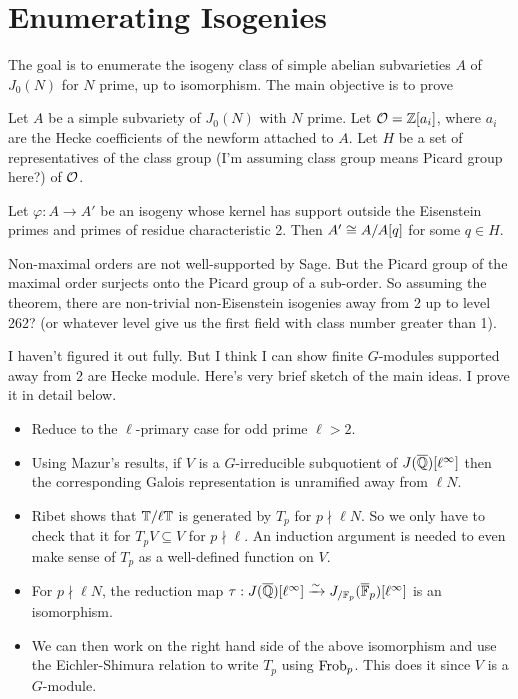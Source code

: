 \documentclass{article}
\begin{document}
\section{Enumerating Isogenies}

The goal is to enumerate the isogeny class of simple abelian subvarieties $A$
of $J_0(N)$ for $N$ prime, up to isomorphism. The main objective is to prove

\begin{theorem}\label{theorem:non_eisen_iso_classify}
    Let $A$ be a simple subvariety of $J_0(N)$ with $N$ prime. Let
    $\mathcal{O}=\mathbb{Z}[a_i]$, where $a_i$ are the Hecke coefficients of the newform
    attached to $A$. Let $H$ be a set of representatives of the class group
    (I'm assuming class group means Picard group here?) of $\mathcal{O}$.

    Let $\varphi:A\to A'$ be an isogeny whose kernel has support outside the
    Eisenstein primes and primes of residue characteristic 2. Then $A'\cong
    A/A[q]$ for some $q\in H$.
\end{theorem}

Non-maximal orders are not well-supported by Sage. But the Picard group of the
maximal order surjects onto the Picard group of a sub-order. So assuming the
theorem, there are non-trivial non-Eisenstein isogenies away from 2 up to level
262? (or whatever level give us the first field with class number greater than
1).

I haven't figured it out fully. But I think I can show finite $G$-modules
supported away from 2 are Hecke module. Here's very brief sketch of the main
ideas. I prove it in detail below.
\begin{itemize}
    \item
        Reduce to the $\ell$-primary case for odd prime $\ell>2$.
    \item
        Using Mazur's results, if $V$ is a $G$-irreducible subquotient of
        $J(\overline{\mathbb{Q}})[\ell^\infty]$ then the corresponding Galois representation
        is unramified away from $\ell N$.
    \item
        Ribet shows that $\mathbb{T}/\ell \mathbb{T}$ is generated by $T_p$ for $p\nmid \ell
        N$. So we only have to check that it for $T_p V\subseteq V$ for
        $p\nmid \ell$. An induction argument is needed to even make sense of
        $T_p$ as a well-defined function on $V$.
    \item
        For $p\nmid \ell N$, the reduction map
        $\tau:J(\overline{\mathbb{Q}})[\ell^\infty]\xrightarrow{\sim} J_{/\mathbb{F}_p}(\overline{\mathbb{F}}_p)[\ell^\infty]$ is an
        isomorphism.
    \item
        We can then work on the right hand side of the above isomorphism and
        use the Eichler-Shimura relation to write $T_p$ using $\operatorname{Frob}_p$. This
        does it since $V$ is a $G$-module.
\end{itemize}
\end{document}
